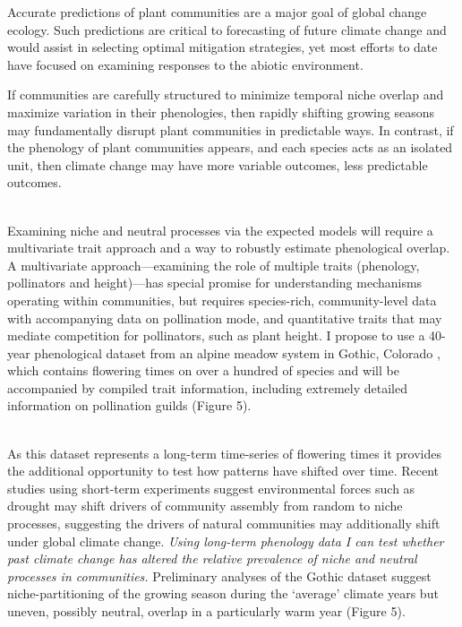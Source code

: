 Accurate predictions of plant communities are a major goal of global change ecology. Such predictions are critical to forecasting of future climate change and would assist in selecting optimal mitigation strategies, yet most efforts to date have focused on examining responses to the abiotic environment. 


If communities are carefully structured to minimize temporal niche overlap and maximize variation in their phenologies, then rapidly shifting growing seasons may fundamentally disrupt plant communities in predictable ways. In contrast, if the phenology of plant communities appears, and each species acts as an isolated unit, then climate change may have more variable outcomes, less predictable outcomes.


\vspace{1ex}\\
Examining niche and neutral processes via the expected models will require a multivariate trait approach and a way to robustly estimate phenological overlap. A multivariate approach---examining the role of multiple traits (phenology, pollinators and height)---has special promise for understanding mechanisms operating within communities, but requires species-rich, community-level data with accompanying data on pollination mode, and quantitative traits that may mediate competition for pollinators, such as plant height. I propose to use a 40-year phenological dataset from an alpine meadow system in Gothic, Colorado \citep[Figure 4-5, see also letter of support from Dr. Inouye, and see][]{Inouye:2008gj}, which contains flowering times on over a hundred of species and will be accompanied by compiled trait information, including extremely detailed information on pollination guilds (Figure 5).


\vspace{1.5ex}\\
As this dataset represents a long-term time-series of flowering times it provides the additional opportunity to test how patterns have shifted over time. Recent studies using short-term experiments suggest environmental forces such as drought may shift drivers of community assembly from random to niche processes, suggesting the drivers of natural communities may additionally shift under global climate change. \emph{Using long-term phenology data I can test whether past climate change has altered the relative prevalence of niche and neutral processes in communities.} Preliminary analyses of the Gothic dataset suggest niche-partitioning of the growing season during the `average' climate years but uneven, possibly neutral, overlap in a particularly warm year (Figure 5). 
\vspace{1ex}\\


